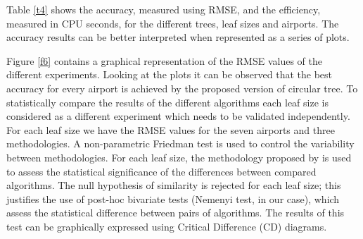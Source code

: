 \documentclass[times,twocolumn,final,authoryear]{elsarticle}
\begin{document}
Table \ref{t4} shows the accuracy, measured using RMSE, and the efficiency, measured in CPU seconds, for the different trees, leaf sizes and airports. The accuracy results can be better interpreted when represented as a series of plots.

Figure \ref{f6} contains a graphical representation of the RMSE values of the different experiments. Looking at the plots it can be observed that the best accuracy for every airport is achieved by the proposed version of circular tree. To statistically compare the results of the different algorithms each leaf size is considered as a different experiment which needs to be validated independently. For each leaf size we have the RMSE values for the seven airports and three methodologies. A non-parametric Friedman test is used to control the variability between methodologies. For each leaf size, the methodology proposed by \citep{Demsar2006} is used to assess the statistical significance of the differences between compared algorithms. The null hypothesis of similarity is rejected for each leaf size; this justifies the use of post-hoc bivariate tests (Nemenyi test, in our case), which assess the statistical difference between pairs of algorithms. The results of this test can be graphically expressed using Critical Difference (CD) diagrams.
\end{document}
